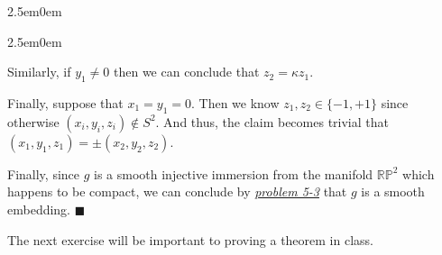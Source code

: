 \documentclass{book}
\newcommand{\inLinkRap}[2]{{\color{blue}\hyperlink{#1}{\textit{#2}}}}
\newcommand{\hTwo}{%
\color{Black}%
   \fontsize{13}{15}\selectfont%
}
\newenvironment{myIndent}{%
   \begin{adjustwidth}{2.5em}{0em}%
}{%
   \end{adjustwidth}%
}
\newcommand{\retTwo}{\hfill\bigbreak}
\begin{document}
\begin{enumerate}
\begin{myIndent}
\begin{myIndent}
			Similarly, if $y_1 \neq 0$ then we can conclude that $z_2 = \kappa z_1$.\newpage
			
			Finally, suppose that $x_1 = y_1 = 0$. Then we know $z_1, z_2 \in \{-1, +1\}$ since\\ otherwise $(x_i, y_i, z_i) \notin S^2$. And thus, the claim becomes trivial that\\ $(x_1, y_1, z_1) = \pm (x_2, y_2, z_2)$.\retTwo
		\end{myIndent}

		Finally, since $g$ is a smooth injective immersion from the manifold $\mathbb{RP}^2$ which happens to be compact, we can conclude by \inLinkRap{Problem 5-3 page 1136}{problem 5-3} that $g$ is a smooth embedding. $\blacksquare$\retTwo
	\end{myIndent}
\end{enumerate}


\hTwo The next exercise will be important to proving a theorem in class.\retTwo
\end{document}
